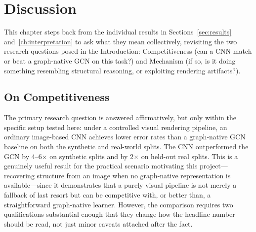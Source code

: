\documentclass[11pt,letterpaper]{article}
\numberwithin{equation}{section}
\numberwithin{figure}{section}
\numberwithin{table}{section}
\begin{document}
\section{Discussion}
\label{ch:discussion}
This chapter steps back from the individual results in Sections~\ref{sec:results} and~\ref{ch:interpretation} to ask what they mean collectively, revisiting the two research questions posed in the Introduction: Competitiveness (can a CNN match or beat a graph-native GCN on this task?) and Mechanism (if so, is it doing something resembling structural reasoning, or exploiting rendering artifacts?).

\subsection{On Competitiveness}
The primary research question is answered affirmatively, but only within the specific setup tested here: under a controlled visual rendering pipeline, an ordinary image-based CNN achieves lower error rates than a graph-native GCN baseline on both the synthetic and real-world splits. The CNN outperformed the GCN by 4--6$\times$ on synthetic splits and by 2$\times$ on held-out real splits. This is a genuinely useful result for the practical scenario motivating this project---recovering structure from an image when no graph-native representation is available---since it demonstrates that a purely visual pipeline is not merely a fallback of last resort but can be competitive with, or better than, a straightforward graph-native learner. However, the comparison requires two qualifications substantial enough that they change how the headline number should be read, not just minor caveats attached after the fact.
\end{document}
